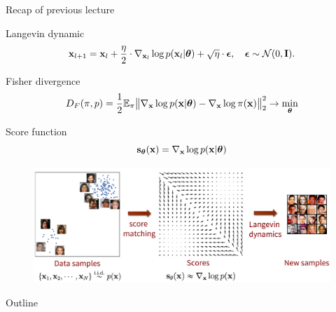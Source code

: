 \begin{frame}{Recap of previous lecture}
	\begin{block}{Langevin dynamic}
		\vspace{-0.3cm}
		\[
			\mathbf{x}_{l + 1} = \mathbf{x}_l + \frac{\eta}{2} \cdot \nabla_{\mathbf{x}_l} \log p(\mathbf{x}_l | \boldsymbol{\theta}) + \sqrt{\eta} \cdot \boldsymbol{\epsilon}, \quad \boldsymbol{\epsilon} \sim \mathcal{N}(0, \mathbf{I}).
		\]
		\vspace{-0.7cm}
	\end{block}
	\begin{block}{Fisher divergence}
		\vspace{-0.3cm}
		\[
			D_F(\pi, p) = \frac{1}{2}\mathbb{E}_{\pi}\bigl\| \nabla_{\mathbf{x}}\log p(\mathbf{x}| \boldsymbol{\theta}) - \nabla_{\mathbf{x}} \log \pi(\mathbf{x}) \bigr\|^2_2 \rightarrow \min_{\boldsymbol{\theta}}
		\]
		\vspace{-0.7cm}
	\end{block}
	\begin{block}{Score function}
		\vspace{-0.5cm}
		 \[
			 \mathbf{s}_{\boldsymbol{\theta}}(\mathbf{x}) = \nabla_{\mathbf{x}}\log p(\mathbf{x}| \boldsymbol{\theta})
		 \]
	 \vspace{-0.8cm}
	\end{block}
	\begin{figure}
		\centering
		\includegraphics[width=0.75\linewidth]{figs/smld}
	\end{figure}
\end{frame}
\begin{frame}{Outline}
	\tableofcontents
\end{frame}
